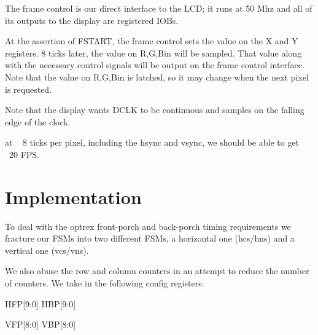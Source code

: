 The frame control is our direct interface to the LCD; it runs at 50
Mhz and all of its outputs to the display are registered IOBs.

At the assertion of FSTART, the frame control sets the value on the X
and Y registers. 8 ticks later, the value on {R,G,B}in will be
sampled. That value along with the necessary control signals will be
output on the frame control interface. Note that the value on
{R,G,B}in is latched, so it may change when the next pixel is
requested.

Note that the display wants DCLK to be continuous and samples on
the falling edge of the clock.

at ~ 8 ticks per pixel, including the hsync and vsync, we should be
able to get ~20 FPS.


\section{Implementation}

To deal with the optrex front-porch and back-porch timing requirements
we fracture our FSMs into two different FSMs, a horizontal one
(hcs/hns) and a vertical one (vcs/vns).

We also abuse the row and column counters in an attempt to reduce the
number of counters. We take in the following config registers: 

HFP[9:0]
HBP[9:0]

VFP[8:0]
VBP[8:0]





